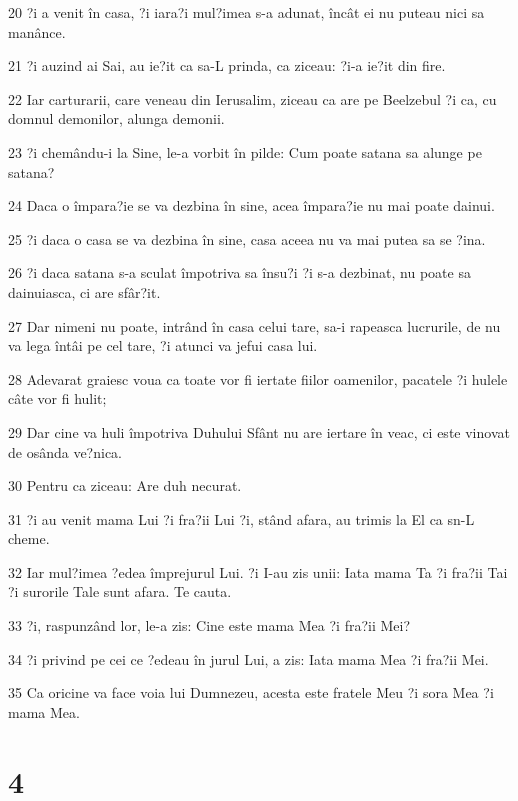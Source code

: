 \par 20 ?i a venit în casa, ?i iara?i mul?imea s-a adunat, încât ei nu puteau nici sa manânce.
\par 21 ?i auzind ai Sai, au ie?it ca sa-L prinda, ca ziceau: ?i-a ie?it din fire.
\par 22 Iar carturarii, care veneau din Ierusalim, ziceau ca are pe Beelzebul ?i ca, cu domnul demonilor, alunga demonii.
\par 23 ?i chemându-i la Sine, le-a vorbit în pilde: Cum poate satana sa alunge pe satana?
\par 24 Daca o împara?ie se va dezbina în sine, acea împara?ie nu mai poate dainui.
\par 25 ?i daca o casa se va dezbina în sine, casa aceea nu va mai putea sa se ?ina.
\par 26 ?i daca satana s-a sculat împotriva sa însu?i ?i s-a dezbinat, nu poate sa dainuiasca, ci are sfâr?it.
\par 27 Dar nimeni nu poate, intrând în casa celui tare, sa-i rapeasca lucrurile, de nu va lega întâi pe cel tare, ?i atunci va jefui casa lui.
\par 28 Adevarat graiesc voua ca toate vor fi iertate fiilor oamenilor, pacatele ?i hulele câte vor fi hulit;
\par 29 Dar cine va huli împotriva Duhului Sfânt nu are iertare în veac, ci este vinovat de osânda ve?nica.
\par 30 Pentru ca ziceau: Are duh necurat.
\par 31 ?i au venit mama Lui ?i fra?ii Lui ?i, stând afara, au trimis la El ca sn-L cheme.
\par 32 Iar mul?imea ?edea împrejurul Lui. ?i I-au zis unii: Iata mama Ta ?i fra?ii Tai ?i surorile Tale sunt afara. Te cauta.
\par 33 ?i, raspunzând lor, le-a zis: Cine este mama Mea ?i fra?ii Mei?
\par 34 ?i privind pe cei ce ?edeau în jurul Lui, a zis: Iata mama Mea ?i fra?ii Mei.
\par 35 Ca oricine va face voia lui Dumnezeu, acesta este fratele Meu ?i sora Mea ?i mama Mea.

\chapter{4}

